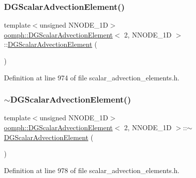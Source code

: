 \subsubsection{\texorpdfstring{D\+G\+Scalar\+Advection\+Element()}{DGScalarAdvectionElement()}}
{\footnotesize\ttfamily template$<$unsigned N\+N\+O\+D\+E\+\_\+1D$>$ \\
\hyperlink{classoomph_1_1DGScalarAdvectionElement}{oomph\+::\+D\+G\+Scalar\+Advection\+Element}$<$ 2, N\+N\+O\+D\+E\+\_\+1D $>$\+::\hyperlink{classoomph_1_1DGScalarAdvectionElement}{D\+G\+Scalar\+Advection\+Element} (\begin{DoxyParamCaption}{ }\end{DoxyParamCaption})\hspace{0.3cm}{\ttfamily [inline]}}



Definition at line 974 of file scalar\+\_\+advection\+\_\+elements.\+h.

\mbox{\label{classoomph_1_1DGScalarAdvectionElement_3_012_00_01NNODE__1D_01_4_a3685f199c4487a78ed548943ab32337e}} 
\subsubsection{\texorpdfstring{$\sim$\+D\+G\+Scalar\+Advection\+Element()}{~DGScalarAdvectionElement()}}
{\footnotesize\ttfamily template$<$unsigned N\+N\+O\+D\+E\+\_\+1D$>$ \\
\hyperlink{classoomph_1_1DGScalarAdvectionElement}{oomph\+::\+D\+G\+Scalar\+Advection\+Element}$<$ 2, N\+N\+O\+D\+E\+\_\+1D $>$\+::$\sim$\hyperlink{classoomph_1_1DGScalarAdvectionElement}{D\+G\+Scalar\+Advection\+Element} (\begin{DoxyParamCaption}{ }\end{DoxyParamCaption})\hspace{0.3cm}{\ttfamily [inline]}}



Definition at line 978 of file scalar\+\_\+advection\+\_\+elements.\+h.



